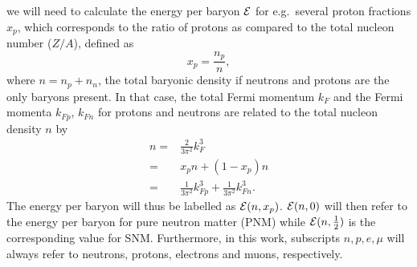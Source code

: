 \documentclass[%
oneside,                 %
final,                   %
10pt]{article}
\begin{document}
we will need to calculate the energy per baryon ${\cal E}$ for e.g.~several 
proton fractions $x_p$, which corresponds to
the ratio of protons as
compared to the total nucleon number ($Z/A$), 
 defined as
\begin{equation}
    x_p = \frac{n_p}{n},
\end{equation}
where $n=n_p+n_n$, the total baryonic density if neutrons and
protons are the only baryons present. In that case,
the total Fermi momentum $k_F$ and the Fermi momenta $k_{Fp}$,
$k_{Fn}$ for protons and neutrons are related to the total nucleon density
$n$ by
\begin{align}
     n = & \frac{2}{3\pi^2} k_F^3 \nonumber \\
       = & x_p n + (1-x_p) n \nonumber \\
       = & \frac{1}{3\pi^2} k_{Fp}^3 + \frac{1}{3\pi^2} k_{Fn}^3.
    \label{eq:densi}
\end{align}
The energy per baryon will thus be
labelled as ${\cal E}(n,x_p)$.
${\cal E}(n,0)$ will then refer to the energy per baryon for pure neutron
matter (PNM) while ${\cal E}(n,\frac{1}{2})$ is the corresponding value for 
SNM. Furthermore, in this work, subscripts $n,p,e,\mu$
will always refer to neutrons, protons, electrons and muons, respectively.
\end{document}
